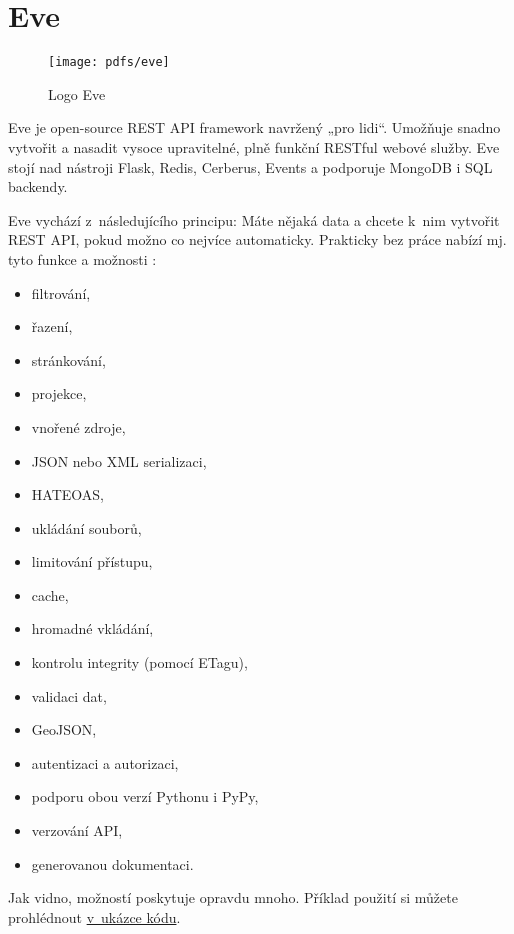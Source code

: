 \section{Eve}\label{eve}

\begin{figure}
\centering
\texttt{[image: pdfs/eve]}
\caption{Logo Eve \autocite{evepic}\label{pic:eve}}
\end{figure}

Eve je open-source REST API framework navržený „pro lidi“. Umožňuje snadno vytvořit a nasadit vysoce upravitelné, plně funkční RESTful webové služby. Eve stojí nad nástroji Flask, Redis, Cerberus, Events a podporuje MongoDB i SQL backendy. \autocite{eve}

Eve vychází z~následujícího principu: Máte nějaká data a chcete k~nim vytvořit REST API, pokud možno co nejvíce automaticky. Prakticky bez práce nabízí mj. tyto funkce a možnosti \autocite{eveslides}:

\begin{itemize}
\tightlist
\item
  filtrování,
\item
  řazení,
\item
  stránkování,
\item
  projekce,
\item
  vnořené zdroje,
\item
  JSON nebo XML serializaci,
\item
  HATEOAS,
\item
  ukládání souborů,
\item
  limitování přístupu,
\item
  cache,
\item
  hromadné vkládání,
\item
  kontrolu integrity (pomocí ETagu),
\item
  validaci dat,
\item
  GeoJSON,
\item
  autentizaci a autorizaci,
\item
  podporu obou verzí Pythonu i PyPy,
\item
  verzování API,
\item
  generovanou dokumentaci.
\end{itemize}

Jak vidno, možností poskytuje opravdu mnoho. Příklad použití si můžete prohlédnout \protect\hyperlink{code:eve}{v~ukázce kódu}.

